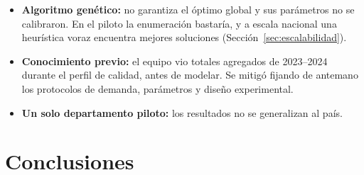 \documentclass[11pt,letterpaper]{article}
\begin{document}
\begin{itemize}
  \item \textbf{Algoritmo genético:} no garantiza el óptimo global y sus parámetros no se calibraron. En el piloto la enumeración bastaría, y a escala nacional una heurística voraz encuentra mejores soluciones (Sección~\ref{sec:escalabilidad}).
  \item \textbf{Conocimiento previo:} el equipo vio totales agregados de 2023--2024 durante el perfil de calidad, antes de modelar. Se mitigó fijando de antemano los protocolos de demanda, parámetros y diseño experimental.
  \item \textbf{Un solo departamento piloto:} los resultados no se generalizan al país.
\end{itemize}

\section{Conclusiones}
\label{sec:conclusiones}
\end{document}
